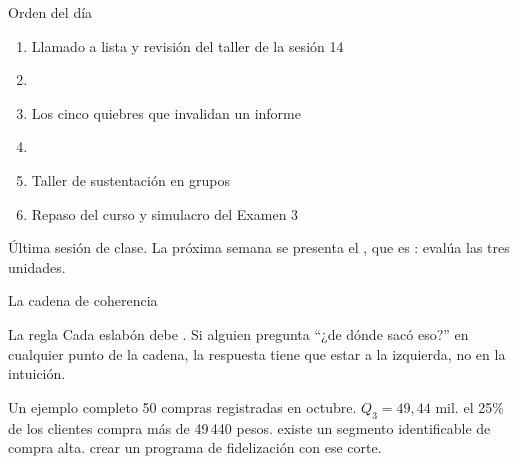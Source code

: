 \documentclass[aspectratio=169,10pt]{beamer}
\begin{document}
\portada

\begin{frame}{Orden del día}
  \begin{enumerate}
    \item Llamado a lista y revisión del taller de la sesión 14
    \item {}
    \item Los cinco quiebres que invalidan un informe
    \item {}
    \item Taller de sustentación en grupos
    \item Repaso del curso y simulacro del Examen 3
  \end{enumerate}

  \vspace{0.25cm}
  {\footnotesize\color{uniGris} Última sesión de clase. La próxima semana se
  presenta el , que es : evalúa
  las tres unidades.}
\end{frame}


\begin{frame}{La cadena de coherencia}
  \centering

  \vspace{0.3cm}
  \begin{alertblock}{La regla}
    \scriptsize
    Cada eslabón debe . Si alguien
    pregunta ``¿de dónde sacó eso?'' en cualquier punto de la cadena, la
    respuesta tiene que estar a la izquierda, no en la intuición.
  \end{alertblock}

  \vspace{0.15cm}
  \begin{exampleblock}{Un ejemplo completo}
    \tiny
     50 compras registradas en octubre. \quad
     $Q_3 = 49{,}44$ mil. \quad
     el 25\% de los clientes compra más de 49\,440 pesos.
    \quad {} existe un segmento identificable de compra alta.
    \quad {} crear un programa de fidelización con ese corte.
  \end{exampleblock}
\end{frame}
\end{document}
